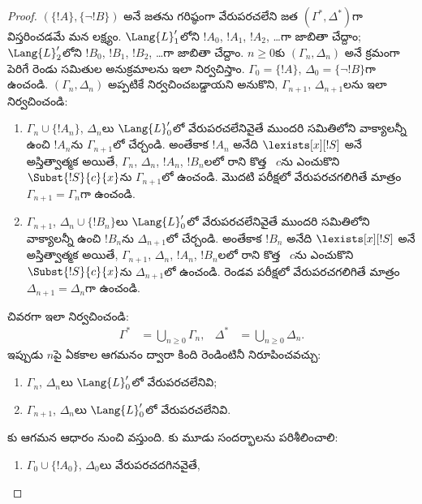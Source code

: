 \documentclass[../../../include/open-logic-section]{subfiles}
\begin{document}
\begin{proof}
$(\{ !A \}, \{\lnot!B\})$ అనే జతను గరిష్ఠంగా వేరుపరచలేని జత
$(\Gamma^*, \Delta^*)$గా విస్తరించడమే మన లక్ష్యం. $\Lang{L}'_1$లోని
 $!A_0$, $!A_1$, $!A_2$, \dots{}గా
జాబితా చేద్దాం; $\Lang{L}'_2$లోని
 $!B_0$, $!B_1$, $!B_2$, \dots{}గా
జాబితా చేద్దాం.
$n \ge 0$కు $(\Gamma_n, \Delta_n)$ అనే క్రమంగా పెరిగే రెండు
 సమితుల అనుక్రమాలను ఇలా నిర్వచిస్తాం.
$\Gamma_0 = \{ !A\}$, $\Delta_0 = \{\lnot !B \}$గా ఉంచండి.
$(\Gamma_n, \Delta_n)$ అప్పటికే నిర్వచించబడ్డాయని అనుకొని,
$\Gamma_{n+1}$, $\Delta_{n+1}$లను ఇలా నిర్వచించండి:
\begin{enumerate}
\item $\Gamma_n \cup \{!A_n \}$, $\Delta_n$లు $\Lang{L}'_0$లో
  వేరుపరచలేనివైతే ముందరి సమితిలోని వాక్యాలన్నీ ఉంచి $!A_n$ను
  $\Gamma_{n+1}$లో చేర్చండి. అంతేకాక $!A_n$
  అనేది $\lexists[x][!S]$ అనే అస్తిత్వాత్మక
   అయితే, $\Gamma_n$, $\Delta_n$, $!A_n$,
  $!B_n$లలో రాని కొత్త ~$c$ను
  ఎంచుకొని $\Subst{!S}{c}{x}$ను $\Gamma_{n+1}$లో ఉంచండి.
  మొదటి పరీక్షలో వేరుపరచగలిగితే మాత్రం $\Gamma_{n+1}=\Gamma_n$గా ఉంచండి.
\item $\Gamma_{n+1}$, $\Delta_n \cup \{!B_n \}$లు $\Lang{L}'_0$లో
  వేరుపరచలేనివైతే ముందరి సమితిలోని వాక్యాలన్నీ ఉంచి $!B_n$ను
  $\Delta_{n+1}$లో చేర్చండి. అంతేకాక $!B_n$
  అనేది $\lexists[x][!S]$ అనే అస్తిత్వాత్మక
   అయితే, $\Gamma_{n+1}$, $\Delta_n$,
  $!A_n$, $!B_n$లలో రాని కొత్త ~$c$ను
  ఎంచుకొని $\Subst{!S}{c}{x}$ను $\Delta_{n+1}$లో ఉంచండి.
  రెండవ పరీక్షలో వేరుపరచగలిగితే మాత్రం $\Delta_{n+1}=\Delta_n$గా ఉంచండి.
\end{enumerate}
చివరగా ఇలా నిర్వచించండి:
\begin{align*}
  \Gamma^* & = \bigcup_{n\ge 0} \Gamma_n, &
  \Delta^* & = \bigcup_{n\ge 0} \Delta_n.
\end{align*}
ఇప్పుడు $n$పై ఏకకాల ఆగమనం ద్వారా కింది రెండింటినీ నిరూపించవచ్చు:
\begin{enumerate}
\item{} $\Gamma_n$, $\Delta_n$లు $\Lang{L}'_0$లో
  వేరుపరచలేనివి;
\item{} $\Gamma_{n+1}$, $\Delta_n$లు $\Lang{L}'_0$లో
  వేరుపరచలేనివి.
\end{enumerate}
కు ఆగమన ఆధారం  నుంచి వస్తుంది.
కు మూడు సందర్భాలను పరిశీలించాలి:
\begin{enumerate}
\item $\Gamma_0 \cup \{!A_0 \}$, $\Delta_0$లు వేరుపరచదగినవైతే,

\end{enumerate}
\end{proof}
\end{document}
